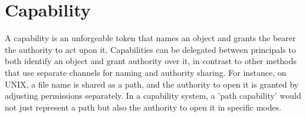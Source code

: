\section{Capability}
A capability\cite{noauthor_capability-based_nodate} is an unforgeable token that names an object and grants the bearer the authority to act upon it. Capabilities can be delegated between 
principals to both identify an object and grant authority over it, in contrast to other methods that use separate channels for 
naming and authority sharing. For instance, on UNIX, a file name is shared as a path, and the authority to open it is 
granted by adjusting permissions separately. In a capability system, a 'path capability' would not just represent a 
path but also the authority to open it in specific modes.
\newline

